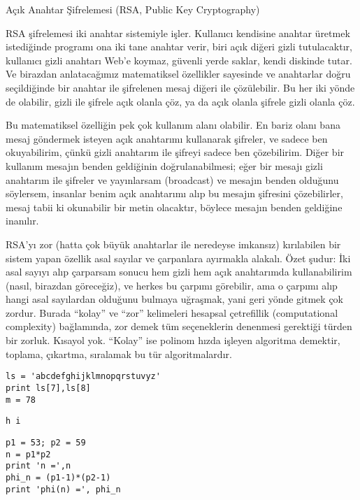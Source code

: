 \documentclass[12pt,fleqn]{article}\usepackage{../../common}
\begin{document}
Açık Anahtar Şifrelemesi (RSA, Public Key Cryptography)

RSA şifrelemesi iki anahtar sistemiyle işler. Kullanıcı kendisine anahtar
üretmek istediğinde programı ona iki tane anahtar verir, biri açık diğeri gizli
tutulacaktır, kullanıcı gizli anahtarı Web'e koymaz, güvenli yerde saklar, kendi
diskinde tutar. Ve birazdan anlatacağımız matematiksel özellikler sayesinde ve
anahtarlar doğru seçildiğinde bir anahtar ile şifrelenen mesaj diğeri ile
çözülebilir. Bu her iki yönde de olabilir, gizli ile şifrele açık olanla çöz, ya
da açık olanla şifrele gizli olanla çöz.

Bu matematiksel özelliğin pek çok kullanım alanı olabilir. En bariz olanı bana
mesaj göndermek isteyen açık anahtarımı kullanarak şifreler, ve sadece ben
okuyabilirim, çünkü gizli anahtarım ile şifreyi sadece ben çözebilirim. Diğer
bir kullanım mesajın benden geldiğinin doğrulanabilmesi; eğer bir mesajı gizli
anahtarım ile şifreler ve yayınlarsam (broadcast) ve mesajın benden olduğunu
söylersem, insanlar benim açık anahtarımı alıp bu mesajın şifresini
çözebilirler, mesaj tabii ki okunabilir bir metin olacaktır, böylece mesajın
benden geldiğine inanılır.

RSA'yı zor (hatta çok büyük anahtarlar ile neredeyse imkansız) kırılabilen bir
sistem yapan özellik asal sayılar ve çarpanlara ayırmakla alakalı. Özet şudur:
İki asal sayıyı alıp çarparsam sonucu hem gizli hem açık anahtarımda
kullanabilirim (nasıl, birazdan göreceğiz), ve herkes bu çarpımı görebilir, ama
o çarpımı alıp hangi asal sayılardan olduğunu bulmaya uğraşmak, yani geri yönde
gitmek çok zordur. Burada ``kolay'' ve ``zor'' kelimeleri hesapsal çetrefillik
(computational complexity) bağlamında, zor demek tüm seçeneklerin denenmesi
gerektiği türden bir zorluk. Kısayol yok. ``Kolay'' ise polinom hızda işleyen
algoritma demektir, toplama, çıkartma, sıralamak bu tür algoritmalardır.

\begin{verbatim}
ls = 'abcdefghijklmnopqrstuvyz'
print ls[7],ls[8]
m = 78
\end{verbatim}

\begin{verbatim}
h i
\end{verbatim}

\begin{verbatim}
p1 = 53; p2 = 59
n = p1*p2
print 'n =',n
phi_n = (p1-1)*(p2-1)
print 'phi(n) =', phi_n
\end{verbatim}
\end{document}
